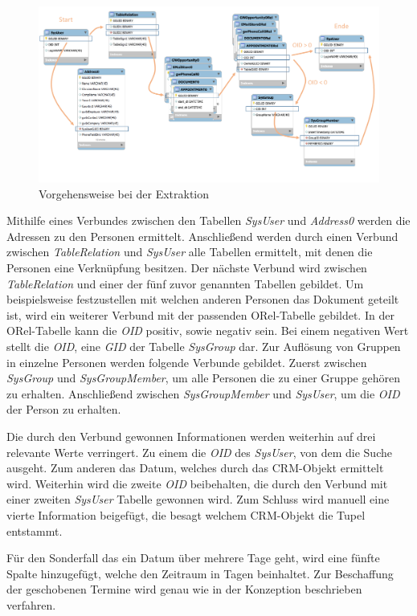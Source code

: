 \begin{figure}[htbp]
\centering
  \includegraphics[width=1.0\textwidth]{pics/konzept_extraktion.pdf}
\caption{Vorgehensweise bei der Extraktion}
\label{umsetzung_extract}
\end{figure} 

Mithilfe eines Verbundes zwischen den Tabellen \textit{SysUser} und \textit{Address0} werden die Adressen zu den Personen ermittelt. Anschließend werden durch einen Verbund zwischen \textit{TableRelation} und \textit{SysUser} alle Tabellen ermittelt, mit denen die Personen eine Verknüpfung besitzen. Der nächste Verbund wird zwischen \textit{TableRelation} und einer der fünf zuvor genannten Tabellen gebildet. Um beispielsweise festzustellen mit welchen anderen Personen das Dokument geteilt ist, wird ein weiterer Verbund mit der passenden ORel-Tabelle gebildet. In der ORel-Tabelle kann die \textit{OID} positiv, sowie negativ sein. Bei einem negativen Wert stellt die \textit{OID}, eine \textit{GID} der Tabelle \textit{SysGroup} dar. Zur Auflösung von Gruppen in einzelne Personen werden folgende Verbunde gebildet. Zuerst zwischen \textit{SysGroup} und \textit{SysGroupMember}, um alle Personen die zu einer Gruppe gehören zu erhalten. Anschließend zwischen \textit{SysGroupMember} und \textit{SysUser}, um die \textit{OID} der Person zu erhalten. 

Die durch den Verbund gewonnen Informationen werden weiterhin auf drei relevante Werte verringert. Zu einem die \textit{OID} des \textit{SysUser}, von dem die Suche ausgeht. Zum anderen das Datum, welches durch das CRM-Objekt ermittelt wird. Weiterhin wird die zweite \textit{OID} beibehalten, die durch den Verbund mit einer zweiten \textit{SysUser} Tabelle gewonnen wird. Zum Schluss wird manuell eine vierte Information beigefügt, die besagt welchem CRM-Objekt die Tupel entstammt. 

Für den Sonderfall das ein Datum über mehrere Tage geht, wird eine fünfte Spalte hinzugefügt, welche den Zeitraum in Tagen beinhaltet. Zur Beschaffung der geschobenen Termine wird genau wie in der Konzeption beschrieben verfahren.

